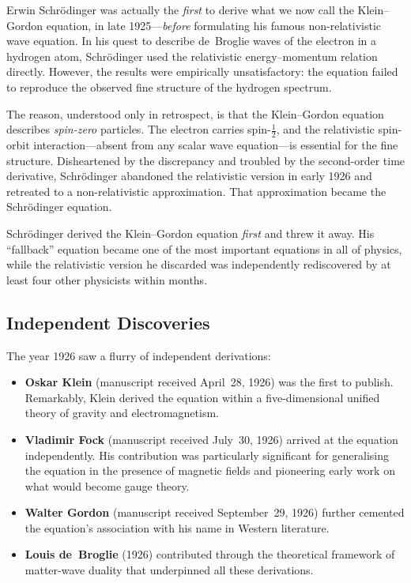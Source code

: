 \documentclass[12pt, a4paper]{article}
\theoremstyle{definition}
\begin{document}
Erwin Schr\"{o}dinger was actually the \emph{first} to derive what we now call the Klein--Gordon equation, in late 1925---\emph{before} formulating his famous non-relativistic wave equation.  In his quest to describe de~Broglie waves of the electron in a hydrogen atom, Schr\"{o}dinger used the relativistic energy--momentum relation directly.  However, the results were empirically unsatisfactory: the equation failed to reproduce the observed fine structure of the hydrogen spectrum.

The reason, understood only in retrospect, is that the Klein--Gordon equation describes \emph{spin-zero} particles.  The electron carries spin-$\tfrac{1}{2}$, and the relativistic spin-orbit interaction---absent from any scalar wave equation---is essential for the fine structure.  Disheartened by the discrepancy and troubled by the second-order time derivative, Schr\"{o}dinger abandoned the relativistic version in early 1926 and retreated to a non-relativistic approximation.  That approximation became the Schr\"{o}dinger equation.

\begin{historical}
Schr\"{o}dinger derived the Klein--Gordon equation \emph{first} and threw it away.  His ``fallback'' equation became one of the most important equations in all of physics, while the relativistic version he discarded was independently rediscovered by at least four other physicists within months.
\end{historical}

\subsection{Independent Discoveries}

The year 1926 saw a flurry of independent derivations:

\begin{itemize}
    \item \textbf{Oskar Klein} (manuscript received April~28, 1926) was the first to publish.  Remarkably, Klein derived the equation within a five-dimensional unified theory of gravity and electromagnetism.
    \item \textbf{Vladimir Fock} (manuscript received July~30, 1926) arrived at the equation independently.  His contribution was particularly significant for generalising the equation in the presence of magnetic fields and pioneering early work on what would become gauge theory.
    \item \textbf{Walter Gordon} (manuscript received September~29, 1926) further cemented the equation's association with his name in Western literature.
    \item \textbf{Louis de~Broglie} (1926) contributed through the theoretical framework of matter-wave duality that underpinned all these derivations.
\end{itemize}
\end{document}
